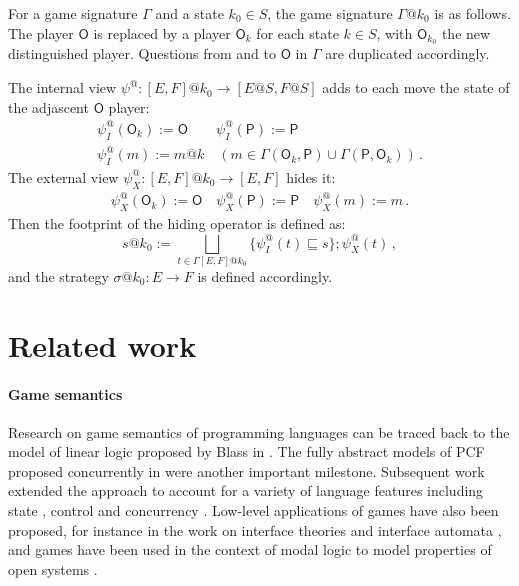 \documentclass[sigplan,screen]{acmart}
\newcommand{\kw}[1]{\ensuremath{ \mathsf{#1} }}
\begin{document}
\begin{definition}
For a game signature $\Gamma$
and a state $k_0 \in S$,
the game signature $\Gamma@k_0$
is as follows.
The player $\kw{O}$ is replaced by
a player $\kw{O}_k$ for each state $k \in S$,
with $\kw{O}_{k_0}$ the new distinguished player.
Questions from and to $\kw{O}$ in $\Gamma$
are duplicated accordingly.
\end{definition}

The internal view $\psi^@ : [E,F]@k_0 \rightarrow [E@S, F@S]$
adds to each move the state of
the adjascent $\kw{O}$ player:
\begin{gather*}
  \psi^@_I(\kw{O}_k) := \kw{O} \qquad
  \psi^@_I(\kw{P}) := \kw{P} \\
  \psi^@_I(m) := m@k \quad
  (m \in \Gamma(\kw{O}_k, \kw{P}) \cup \Gamma(\kw{P}, \kw{O}_k)) \,.
\end{gather*}
The external view $\psi^@_X : [E,F]@k_0 \rightarrow [E,F]$
hides it:
\begin{gather*}
  \psi^@_X(\kw{O}_k) := \kw{O} \quad
  \psi^@_X(\kw{P}) := \kw{P} \quad
  \psi^@_X(m) := m \,.
\end{gather*}
Then the footprint of the hiding operator is defined as:
\[
  s@k_0 := \bigsqcup_{t \in \Gamma [E,F]@k_0}
    \{ \psi^@_I(t) \sqsubseteq s \} ; \psi^@_X(t) \,,
\]
and the strategy $\sigma@k_0 : E \rightarrow F$
is defined accordingly.



\section{Related work} \label{sec:rw} %

%

\paragraph{Game semantics}

Research on game semantics of programming languages
can be traced back to the model of linear logic
proposed by Blass in \cite{gsll}.
The fully abstract models of PCF proposed concurrently in
\cite{pcfajm,pcfho} were another important milestone.
Subsequent work
extended the approach to account for a variety of
language features including
state \cite{gsia},
control \cite{gscontrol} and
concurrency \cite{asfgc,agames,cgames}.
Low-level applications of games have also been proposed,
for instance in the work on interface theories
and interface automata \cite{ia,gmos,itcd,gtf},
and games have been used in the context of modal logic
to model properties of open systems
\cite{atl,altref}.
\end{document}
